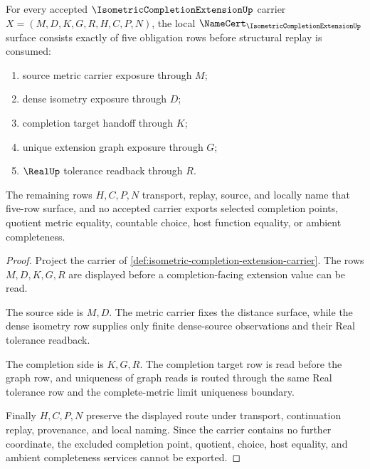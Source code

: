 \begin{theorem}
\label{thm:isometric-completion-extension-namecert-obligations}
For every accepted $\IsometricCompletionExtensionUp$ carrier $X=(M,D,K,G,R,H,C,P,N)$, the local $\NameCert_{\IsometricCompletionExtensionUp}$ surface consists exactly of five obligation rows before structural replay is consumed:
\begin{enumerate}
\item source metric carrier exposure through $M$;
\item dense isometry exposure through $D$;
\item completion target handoff through $K$;
\item unique extension graph exposure through $G$;
\item $\RealUp$ tolerance readback through $R$.
\end{enumerate}
The remaining rows $H,C,P,N$ transport, replay, source, and locally name that five-row surface, and no accepted carrier exports selected completion points, quotient metric equality, countable choice, host function equality, or ambient completeness.
\end{theorem}
\begin{proof}
Project the carrier of \autoref{def:isometric-completion-extension-carrier}. The rows $M,D,K,G,R$ are displayed before a completion-facing extension value can be read.

The source side is $M,D$. The metric carrier fixes the distance surface, while the dense isometry row supplies only finite dense-source observations and their Real tolerance readback.

The completion side is $K,G,R$. The completion target row is read before the graph row, and uniqueness of graph reads is routed through the same Real tolerance row and the complete-metric limit uniqueness boundary.

Finally $H,C,P,N$ preserve the displayed route under transport, continuation replay, provenance, and local naming. Since the carrier contains no further coordinate, the excluded completion point, quotient, choice, host equality, and ambient completeness services cannot be exported.
\end{proof}

